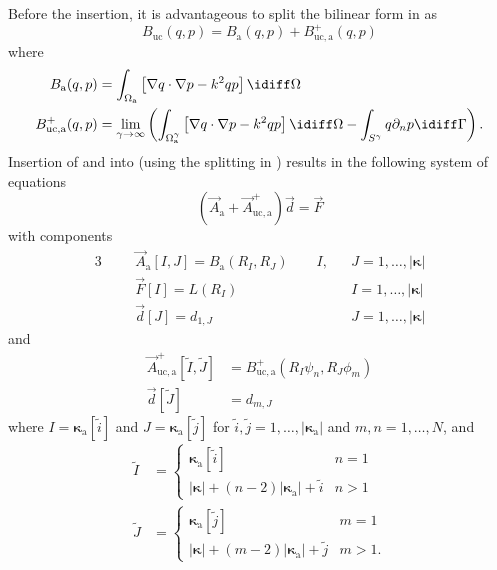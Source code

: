 Before the insertion, it is advantageous to split the bilinear form in  as
\begin{equation}\label{Eq2:SplittingOfB_uc}
	B_{\mathrm{uc}}(q,p) = B_{\mathrm{a}}(q,p) + B_{\mathrm{uc},\mathrm{a}}^+(q,p)
\end{equation}
where
\begin{align}
	B_{\mathrm{a}}(q,p) &= \int_{\Omega_{\mathrm{a}}} \left[\nabla q\cdot \nabla p - k^2 qp\right]\idiff\Omega\nonumber\\
	B_{\mathrm{uc},\mathrm{a}}^+(q,p) &= \lim_{\gamma\to\infty}\left(\int_{\Omega_{\mathrm{a}}^\gamma} \left[\nabla q\cdot \nabla p - k^2 qp\right]\idiff\Omega - \int_{S^\gamma} q\partial_n p\idiff\Gamma\right).\label{Eq2:B_uc_a}	
\end{align}
Insertion of  and  into  (using the splitting in ) results in the following system of equations
\begin{equation}
	(\vec{A}_{\mathrm{a}} + \vec{A}_{\mathrm{uc},\mathrm{a}}^+)\vec{d} = \vec{F}
\end{equation}
with components
\begin{alignat*}{3}
	& &&\vec{A}_{\mathrm{a}}[I,J] = B_{\mathrm{a}}(R_I,R_J)\qquad I, && J = 1,\dots,|\boldsymbol\kappa|\\
	& &&\vec{F}[I] = L(R_I)\qquad && I = 1,\dots,|\boldsymbol\kappa|\\
	& &&\vec{d}[J] = d_{1,J}\qquad && J = 1,\dots,|\boldsymbol\kappa|
\end{alignat*}
and
\begin{align*}
	\vec{A}_{\mathrm{uc},\mathrm{a}}^+[\tilde{I},\tilde{J}] &= B_{\mathrm{uc},\mathrm{a}}^+(R_I\psi_n,R_J\phi_m)\\
	\vec{d}[\tilde{J}] &= d_{m,J}
\end{align*}
where $I = \boldsymbol\kappa_{\mathrm{a}}[\tilde{i}]$ and $J = \boldsymbol\kappa_{\mathrm{a}}[\tilde{j}]$ for $\tilde{i},\tilde{j}=1,\dots,|\boldsymbol\kappa_{\mathrm{a}}|$ and $m,n=1,\dots,N$, and
\begin{align*}
	\tilde{I} &= \begin{cases}\boldsymbol\kappa_{\mathrm{a}}[\tilde{i}] & n = 1\\
	|\boldsymbol\kappa|+(n-2)|\boldsymbol\kappa_{\mathrm{a}}|+\tilde{i} & n>1\end{cases}\\
	\tilde{J} &= \begin{cases}\boldsymbol\kappa_{\mathrm{a}}[\tilde{j}] & m = 1\\
	|\boldsymbol\kappa|+(m-2)|\boldsymbol\kappa_{\mathrm{a}}|+\tilde{j} & m>1.\end{cases}
\end{align*}
